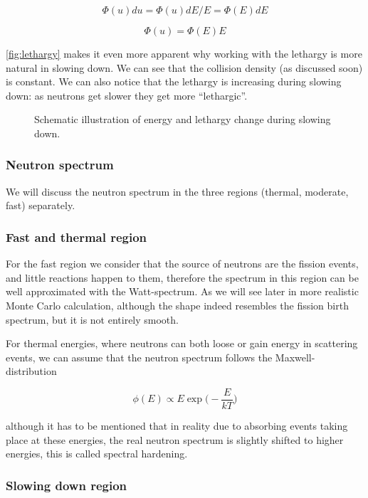$$\Phi (u)du=\Phi (u)dE/E=\Phi (E)dE$$

$$\Phi(u)=\Phi(E)E$$

\autoref{fig:lethargy} makes it even more apparent why working with the lethargy is more natural in slowing down. We can see that the collision density (as discussed soon) is constant. We can also notice that the lethargy is increasing during slowing down: as neutrons get slower they get more ``lethargic''.

\begin{figure}[ht!]
\protect {}\protect
\caption{\label{fig:lethargy} \footnotesize{Schematic illustration of energy and lethargy change during slowing down.}}
\end{figure}

\subsubsection{Neutron spectrum}

We will discuss the neutron spectrum in the three regions (thermal, moderate, fast) separately.

\subsubsection*{Fast and thermal region}

For the fast region we consider that the source of neutrons are the fission events, and little reactions happen to them, therefore the spectrum in this region can be well approximated with the Watt-spectrum. As we will see later in more realistic Monte Carlo calculation, although the shape indeed resembles the fission birth spectrum, but it is not entirely smooth.

For thermal energies, where neutrons can both loose or gain energy in scattering events, we can assume that the neutron spectrum follows the Maxwell-distribution

$$\phi(E)\propto E\exp\big(-\frac{E}{kT}\big)$$

\noindent although it has to be mentioned that in reality due to absorbing events taking place at these energies, the real neutron spectrum is slightly shifted to higher energies, this is called spectral hardening.

\subsubsection*{Slowing down region}

